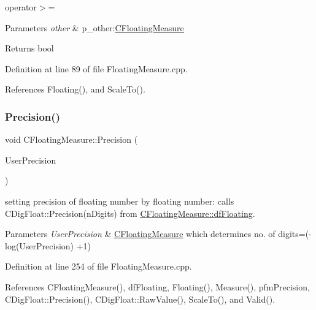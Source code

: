 operator$>$= 


\begin{DoxyParams}{Parameters}
{\em other} & p\+\_\+other\+:\hyperlink{classCFloatingMeasure}{C\+Floating\+Measure} \\
\hline
\end{DoxyParams}
\begin{DoxyReturn}{Returns}
bool 
\end{DoxyReturn}


Definition at line 89 of file Floating\+Measure.\+cpp.



References Floating(), and Scale\+To().

\mbox{\label{classCFloatingMeasure_abaedeff78fb7009c788df5a016bc46d5}} 
\subsubsection{\texorpdfstring{Precision()}{Precision()}\hspace{0.1cm}{\footnotesize\ttfamily [1/2]}}
{\footnotesize\ttfamily void C\+Floating\+Measure\+::\+Precision (\begin{DoxyParamCaption}\item[{const \hyperlink{classCFloatingMeasure}{C\+Floating\+Measure} \&}]{User\+Precision }\end{DoxyParamCaption})}



setting precision of floating number by floating number\+: calls C\+Dig\+Float\+::\+Precision(n\+Digits) from \hyperlink{classCFloatingMeasure_aa0cec9966c6c08db75c493e44396cfc2}{C\+Floating\+Measure\+::df\+Floating}. 


\begin{DoxyParams}{Parameters}
{\em User\+Precision} & \hyperlink{classCFloatingMeasure}{C\+Floating\+Measure} which determines no. of digits=(-\/log(User\+Precision) +1) \\
\hline
\end{DoxyParams}


Definition at line 254 of file Floating\+Measure.\+cpp.



References C\+Floating\+Measure(), df\+Floating, Floating(), Measure(), pfm\+Precision, C\+Dig\+Float\+::\+Precision(), C\+Dig\+Float\+::\+Raw\+Value(), Scale\+To(), and Valid().


